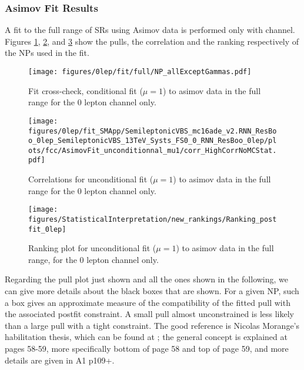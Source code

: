 


\clearpage
\subsubsection{Asimov Fit Results}
A fit to the full range of SRs using Asimov data is performed only with \zlep channel.
Figures \ref{fig:fit_0lep_fcc_asimov}, \ref{fig:fit_0lep_corr_asimov}, and \ref{fig:fit_0lep_ranking_asimov} show the pulls, the correlation and the ranking respectively of the NPs used in the fit.
\begin{figure}[ht]
      \centering
        \texttt{[image: figures/0lep/fit/full/NP\_allExceptGammas.pdf]}
        \caption{Fit cross-check, conditional fit ($\mu=1$) to asimov data in the full range for the 0 lepton channel only.}
       \label{fig:fit_0lep_fcc_asimov}
\end{figure}
\begin{figure}[ht]
      \centering
        \texttt{[image: figures/0lep/fit\_SMApp/SemileptonicVBS\_mc16ade\_v2.RNN\_ResBoo\_0lep\_SemileptonicVBS\_13TeV\_Systs\_FS0\_0\_RNN\_ResBoo\_0lep/plots/fcc/AsimovFit\_unconditionnal\_mu1/corr\_HighCorrNoMCStat.pdf]}
        \caption{Correlations for unconditional fit ($\mu=1$) to asimov data in the full range for the 0 lepton channel only.}
       \label{fig:fit_0lep_corr_asimov}
\end{figure}
\begin{figure}[ht]
      \centering
        \texttt{[image: figures/StatisticalInterpretation/new\_rankings/Ranking\_postfit\_0lep]}
        \caption{Ranking plot for unconditional fit ($\mu=1$) to asimov data in the full range, for the 0 lepton channel only.}
       \label{fig:fit_0lep_ranking_asimov}
\end{figure}

Regarding the pull plot just shown and all the ones shown in the following, 
we can give more details about the black boxes that are shown.
For a given NP, such a box gives an approximate measure of the compatibility of the fitted pull 
with the associated postfit constraint. 
A small pull almost unconstrained is less likely than a large pull with a tight constraint. 
The good reference is Nicolas Morange's habilitation thesis, which can be found at \cite{morange:tel-03341303};
the general concept is explained at pages 58-59, more specifically bottom of page 58 and top of page 59, 
and more details are given in A1 p109+.

